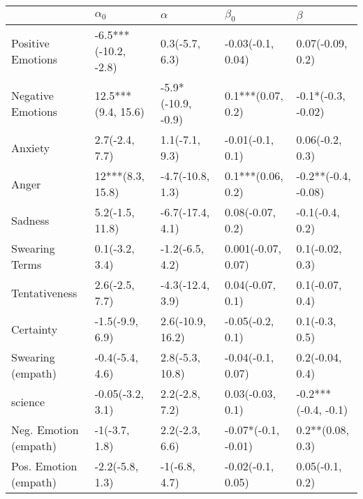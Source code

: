 \begin{tabular}{lllll}
\toprule
{} &            $\alpha_0$ &            $\alpha$ &            $\beta_0$ &              $\beta$ \\
\midrule
Positive Emotions     &  -6.5***(-10.2, -2.8) &      0.3(-5.7, 6.3) &    -0.03(-0.1, 0.04) &     0.07(-0.09, 0.2) \\
Negative Emotions     &    12.5***(9.4, 15.6) &  -5.9*(-10.9, -0.9) &    0.1***(0.07, 0.2) &   -0.1*(-0.3, -0.02) \\
Anxiety               &        2.7(-2.4, 7.7) &      1.1(-7.1, 9.3) &     -0.01(-0.1, 0.1) &      0.06(-0.2, 0.3) \\
Anger                 &      12***(8.3, 15.8) &    -4.7(-10.8, 1.3) &    0.1***(0.06, 0.2) &  -0.2**(-0.4, -0.08) \\
Sadness               &       5.2(-1.5, 11.8) &    -6.7(-17.4, 4.1) &     0.08(-0.07, 0.2) &      -0.1(-0.4, 0.2) \\
Swearing Terms        &        0.1(-3.2, 3.4) &     -1.2(-6.5, 4.2) &   0.001(-0.07, 0.07) &      0.1(-0.02, 0.3) \\
Tentativeness         &        2.6(-2.5, 7.7) &    -4.3(-12.4, 3.9) &     0.04(-0.07, 0.1) &      0.1(-0.07, 0.4) \\
Certainty             &       -1.5(-9.9, 6.9) &    2.6(-10.9, 16.2) &     -0.05(-0.2, 0.1) &       0.1(-0.3, 0.5) \\
Swearing (empath)     &       -0.4(-5.4, 4.6) &     2.8(-5.3, 10.8) &    -0.04(-0.1, 0.07) &      0.2(-0.04, 0.4) \\
science               &      -0.05(-3.2, 3.1) &      2.2(-2.8, 7.2) &     0.03(-0.03, 0.1) &  -0.2***(-0.4, -0.1) \\
Neg. Emotion (empath) &         -1(-3.7, 1.8) &      2.2(-2.3, 6.6) &  -0.07*(-0.1, -0.01) &     0.2**(0.08, 0.3) \\
Pos. Emotion (empath) &       -2.2(-5.8, 1.3) &       -1(-6.8, 4.7) &    -0.02(-0.1, 0.05) &      0.05(-0.1, 0.2) \\
\bottomrule
\end{tabular}
